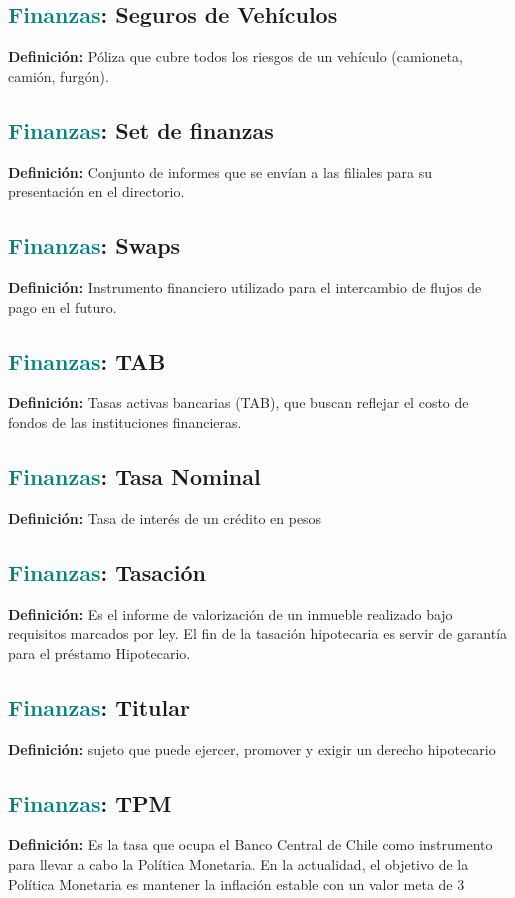 \documentclass[12pt]{article}
\begin{document}
\subsection{\textcolor{teal}{Finanzas}: Seguros de Vehículos}
\textbf{Definición:} Póliza que cubre todos los riesgos de un vehículo (camioneta, camión, furgón).
\subsection{\textcolor{teal}{Finanzas}: Set de finanzas}
\textbf{Definición:} Conjunto de informes que se envían a las filiales para su presentación en el directorio.
\subsection{\textcolor{teal}{Finanzas}: Swaps}
\textbf{Definición:} Instrumento financiero utilizado para el intercambio de flujos de pago en el futuro.
\subsection{\textcolor{teal}{Finanzas}: TAB}
\textbf{Definición:} Tasas activas bancarias (TAB), que buscan reflejar el costo de fondos de las instituciones financieras.
\subsection{\textcolor{teal}{Finanzas}: Tasa Nominal}
\textbf{Definición:} Tasa de interés de un crédito en pesos
\subsection{\textcolor{teal}{Finanzas}: Tasación}
\textbf{Definición:} Es el informe de valorización de un inmueble realizado bajo requisitos marcados por ley. El fin de la tasación hipotecaria es servir de garantía para el préstamo Hipotecario.
\subsection{\textcolor{teal}{Finanzas}: Titular}
\textbf{Definición:} sujeto que puede ejercer, promover y exigir un derecho hipotecario
\subsection{\textcolor{teal}{Finanzas}: TPM}
\textbf{Definición:} Es la tasa que ocupa el Banco Central de Chile como instrumento para llevar a cabo la Política Monetaria. En la actualidad, el objetivo de la Política Monetaria es mantener la inflación estable con un valor meta de 3%
\end{document}
